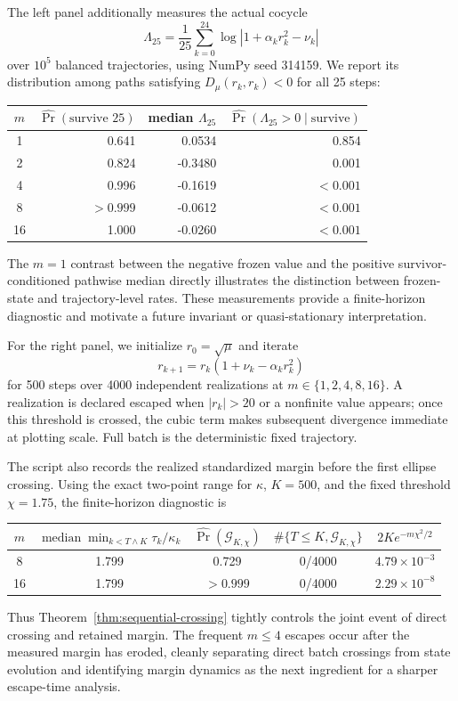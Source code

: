 \documentclass[11pt]{article}
\begin{document}
The left panel additionally measures the actual cocycle
\[
\Lambda_{25}
=\frac1{25}\sum_{k=0}^{24}
\log|1+\alpha_k r_k^2-\nu_k|
\]
over \(10^5\) balanced trajectories, using NumPy seed 314159.  We report its
distribution among paths satisfying \(D_\mu(r_k,r_k)<0\) for all 25 steps:
\begin{center}
\small
\begin{tabular}{@{}crrr@{}}
\toprule
\(m\)&\(\widehat{\Pr}(\text{survive }25)\)&
median \(\Lambda_{25}\)&
\(\widehat{\Pr}(\Lambda_{25}>0\mid\text{survive})\)\\
\midrule
1&0.641&0.0534&0.854\\
2&0.824&-0.3480&0.001\\
4&0.996&-0.1619&\(<0.001\)\\
8&\(>0.999\)&-0.0612&\(<0.001\)\\
16&1.000&-0.0260&\(<0.001\)\\
\bottomrule
\end{tabular}
\end{center}
The \(m=1\) contrast between the negative frozen value and the positive
survivor-conditioned pathwise median directly illustrates the distinction
between frozen-state and trajectory-level rates.  These measurements provide
a finite-horizon diagnostic and motivate a future invariant or
quasi-stationary interpretation.

For the right panel, we initialize \(r_0=\sqrt\mu\) and iterate
\[
r_{k+1}=r_k(1+\nu_k-\alpha_k r_k^2)
\]
for 500 steps over 4000 independent realizations at
\(m\in\{1,2,4,8,16\}\).  A realization is declared escaped when
\(|r_k|>20\) or a nonfinite value appears; once this threshold is crossed,
the cubic term makes subsequent divergence immediate at plotting scale.
Full batch is the deterministic fixed trajectory.

The script also records the realized standardized margin before the first
ellipse crossing.  Using the exact two-point range for \(\kappa\), \(K=500\),
and the fixed threshold \(\chi=1.75\), the finite-horizon diagnostic is
\begin{center}
\small
\begin{tabular}{@{}ccccc@{}}
\toprule
\(m\)&
\(\operatorname{median}\min_{k<T\wedge K}\tau_k/\kappa_k\)&
\(\widehat{\Pr}(\mathcal G_{K,\chi})\)&
\(\#\{T\le K,\mathcal G_{K,\chi}\}\)&
\(2Ke^{-m\chi^2/2}\)\\
\midrule
8&1.799&0.729&0/4000&\(4.79\times10^{-3}\)\\
16&1.799&\(>0.999\)&0/4000&\(2.29\times10^{-8}\)\\
\bottomrule
\end{tabular}
\end{center}
Thus Theorem~\ref{thm:sequential-crossing} tightly controls the joint event
of direct crossing and retained margin.  The frequent \(m\le4\) escapes occur
after the measured margin has eroded, cleanly separating direct batch
crossings from state evolution and identifying margin dynamics as the next
ingredient for a sharper escape-time analysis.
\end{document}

